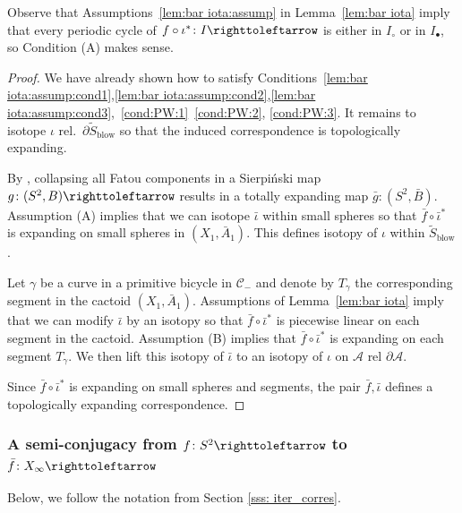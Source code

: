 \documentclass{amsart}
\theoremstyle{plain}
\theoremstyle{definition}
\theoremstyle{remark}
\renewcommand{\AA}{{\mathcal A}}
\newcommand{\blowup}{{\operatorname{blow}}}
\newcommand{\reminder}[1]{\textsl{$\lhd\rhd$#1$\lhd\rhd$}\marginpar{$\lhd\rhd\lhd\rhd\lhd\rhd$}}%
\newcommand{\hide}[1]{}
\newcommand{\CC}{{\mathcal C}}
\newcommand\selfmap{\righttoleftarrow}
\begin{document}
Observe that Assumptions~\eqref{lem:bar iota:assump} in Lemma~\ref{lem:bar iota} imply that every periodic cycle of $ f\circ \iota^*\colon I\selfmap$ is either in $I_\circ$ or in $I_\bullet$, so Condition (A) makes sense. 


\begin{proof}
We have already shown how to satisfy Conditions~\ref{lem:bar iota:assump:cond1},\ref{lem:bar iota:assump:cond2},\ref{lem:bar iota:assump:cond3},~\ref{cond:PW:1}~\ref{cond:PW:2}, \ref{cond:PW:3}. It remains to isotope $\iota$ rel.\ $\partial \widetilde S_\blowup$ so that the induced correspondence is topologically expanding. 

By \cite{Meyer_Sierp, BD_Exp},  collapsing all Fatou components in a Sierpi\'{n}ski map  $g\colon(S^2, B)\selfmap$ results in a totally  expanding map $\bar g\colon(S^2, \bar B)$.  Assumption (A) implies that we can isotope $\bar \iota$ within small spheres so that $\bar f \circ \bar \iota^*$ is expanding on small spheres in $(X_1,\bar A_1)$. This defines isotopy of $\iota$ within $\widetilde S_\blowup$.

Let $\gamma$ be a curve in a primitive bicycle in $\CC_-$ and denote by $T_\gamma$ the corresponding segment in the cactoid $(X_1, \bar A_1)$.  
Assumptions of Lemma~\ref{lem:bar iota} imply that we can modify $\bar \iota$ by an isotopy so that $\bar f \circ \bar \iota^*$ is piecewise linear on each segment in the cactoid.  Assumption (B) implies that $\bar f \circ \bar \iota^*$ is expanding on each segment $T_\gamma$.  We then lift this isotopy of $\bar \iota$ to an isotopy of $\iota$ on $\AA$ rel $\partial \AA$.

Since $\bar f \circ \bar \iota^*$ is expanding on small spheres and segments, the pair $\bar f,\bar \iota$ defines a topologically expanding correspondence. 

\end{proof}




\subsubsection{A semi-conjugacy from $f\colon S^2\selfmap$ to $\bar f\colon X_\infty\selfmap$}
Below, we follow the notation from Section \ref{sss: iter_corres}.
\end{document}
